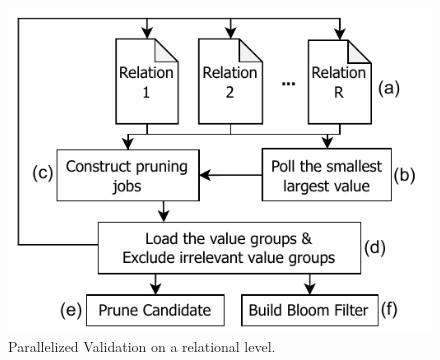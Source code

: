 \begin{figure}
    \centering
    \includegraphics[width=.58\textwidth]{figures/multi_validation.pdf}
    \caption{Parallelized Validation on a relational level.}
    \label{fig:parallel_validation}
\end{figure}

